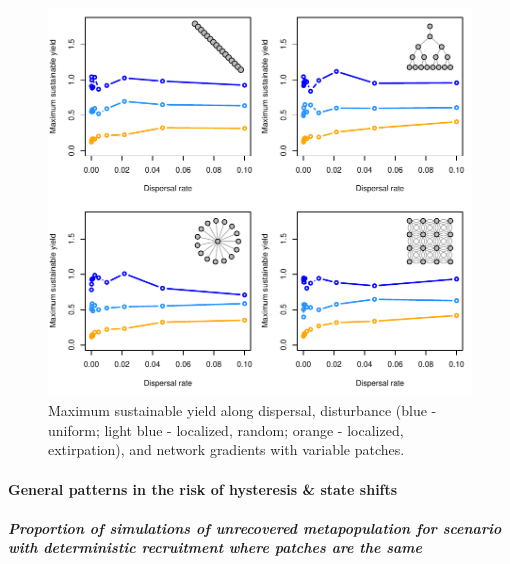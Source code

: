 \documentclass[]{article}
\let\oldparagraph\paragraph
\renewcommand{\paragraph}[1]{\oldparagraph{#1}\mbox{}}
\let\oldsubparagraph\subparagraph
\renewcommand{\subparagraph}[1]{\oldsubparagraph{#1}\mbox{}}
\begin{document}
\begin{figure}[H]

{\centering \includegraphics{Managing_for_ecological_surprises_in_metapopulations_makeHTML_files/figure-latex/MSY with variable patches and space-time stochasticity-1} 

}

\caption{Maximum sustainable yield along dispersal, disturbance (blue - uniform; light blue - localized, random; orange - localized, extirpation), and network gradients with variable patches.}\label{fig:MSY with variable patches and space-time stochasticity}
\end{figure}

\hypertarget{general-patterns-in-the-risk-of-hysteresis-state-shifts}{%
\paragraph{General patterns in the risk of hysteresis \& state
shifts}\label{general-patterns-in-the-risk-of-hysteresis-state-shifts}}

\hypertarget{proportion-of-simulations-of-unrecovered-metapopulation-for-scenario-with-deterministic-recruitment-where-patches-are-the-same}{%
\subparagraph{Proportion of simulations of unrecovered metapopulation
for scenario with deterministic recruitment where patches are the
same}\label{proportion-of-simulations-of-unrecovered-metapopulation-for-scenario-with-deterministic-recruitment-where-patches-are-the-same}}
\end{document}
